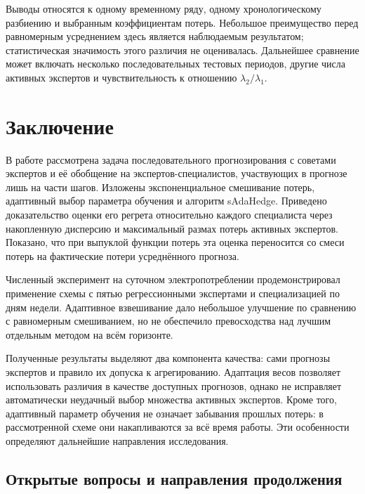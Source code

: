 \documentclass[a4paper,12pt]{article}
\theoremstyle{plain}
\theoremstyle{definition}
\theoremstyle{remark}
\numberwithin{equation}{section}
\begin{document}
Выводы относятся к одному временному ряду, одному хронологическому разбиению и выбранным коэффициентам потерь. Небольшое преимущество перед равномерным усреднением здесь является наблюдаемым результатом; статистическая значимость этого различия не оценивалась. Дальнейшее сравнение может включать несколько последовательных тестовых периодов, другие числа активных экспертов и чувствительность к отношению $\lambda_2/\lambda_1$.

\FloatBarrier

\section{Заключение}
\label{sec:conclusion}

В работе рассмотрена задача последовательного прогнозирования с советами экспертов и её обобщение на экспертов-специалистов, участвующих в прогнозе лишь на части шагов. Изложены экспоненциальное смешивание потерь, адаптивный выбор параметра обучения и алгоритм sAdaHedge. Приведено доказательство оценки его регрета относительно каждого специалиста через накопленную дисперсию и максимальный размах потерь активных экспертов. Показано, что при выпуклой функции потерь эта оценка переносится со смеси потерь на фактические потери усреднённого прогноза.

Численный эксперимент на суточном электропотреблении продемонстрировал применение схемы с пятью регрессионными экспертами и специализацией по дням недели. Адаптивное взвешивание дало небольшое улучшение по сравнению с равномерным смешиванием, но не обеспечило превосходства над лучшим отдельным методом на всём горизонте. %

Полученные результаты выделяют два компонента качества: сами прогнозы экспертов и правило их допуска к агрегированию. Адаптация весов позволяет использовать различия в качестве доступных прогнозов, однако не исправляет автоматически неудачный выбор множества активных экспертов. Кроме того, адаптивный параметр обучения не означает забывания прошлых потерь: в рассмотренной схеме они накапливаются за всё время работы. Эти особенности определяют дальнейшие направления исследования.

\subsection*{Открытые вопросы и направления продолжения}
\end{document}
